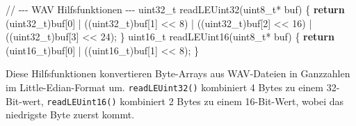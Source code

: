 \documentclass[
  ngerman,
  letterpaper,
  DIV=11]{scrreprt}
\newenvironment{Shaded}{\begin{snugshade}}{\end{snugshade}}
\newcommand{\CommentTok}[1]{\textcolor[rgb]{0.37,0.37,0.37}{#1}}
\newcommand{\ControlFlowTok}[1]{\textcolor[rgb]{0.00,0.23,0.31}{\textbf{#1}}}
\newcommand{\DataTypeTok}[1]{\textcolor[rgb]{0.68,0.00,0.00}{#1}}
\newcommand{\DecValTok}[1]{\textcolor[rgb]{0.68,0.00,0.00}{#1}}
\newcommand{\NormalTok}[1]{\textcolor[rgb]{0.00,0.23,0.31}{#1}}
\newcommand{\OperatorTok}[1]{\textcolor[rgb]{0.37,0.37,0.37}{#1}}
\begin{document}
\begin{Shaded}
\begin{Highlighting}[]
\CommentTok{// {-}{-}{-} WAV Hilfsfunktionen {-}{-}{-}}
\DataTypeTok{uint32\_t}\NormalTok{ readLEUint32}\OperatorTok{(}\DataTypeTok{uint8\_t}\OperatorTok{*}\NormalTok{ buf}\OperatorTok{)} \OperatorTok{\{}
  \ControlFlowTok{return} \OperatorTok{(}\DataTypeTok{uint32\_t}\OperatorTok{)}\NormalTok{buf}\OperatorTok{[}\DecValTok{0}\OperatorTok{]} \OperatorTok{|} \OperatorTok{((}\DataTypeTok{uint32\_t}\OperatorTok{)}\NormalTok{buf}\OperatorTok{[}\DecValTok{1}\OperatorTok{]} \OperatorTok{\textless{}\textless{}} \DecValTok{8}\OperatorTok{)} 
  \OperatorTok{|} \OperatorTok{((}\DataTypeTok{uint32\_t}\OperatorTok{)}\NormalTok{buf}\OperatorTok{[}\DecValTok{2}\OperatorTok{]} \OperatorTok{\textless{}\textless{}} \DecValTok{16}\OperatorTok{)} \OperatorTok{|} \OperatorTok{((}\DataTypeTok{uint32\_t}\OperatorTok{)}\NormalTok{buf}\OperatorTok{[}\DecValTok{3}\OperatorTok{]} \OperatorTok{\textless{}\textless{}} \DecValTok{24}\OperatorTok{);}
\OperatorTok{\}}
\DataTypeTok{uint16\_t}\NormalTok{ readLEUint16}\OperatorTok{(}\DataTypeTok{uint8\_t}\OperatorTok{*}\NormalTok{ buf}\OperatorTok{)} \OperatorTok{\{}
  \ControlFlowTok{return} \OperatorTok{(}\DataTypeTok{uint16\_t}\OperatorTok{)}\NormalTok{buf}\OperatorTok{[}\DecValTok{0}\OperatorTok{]} \OperatorTok{|} \OperatorTok{((}\DataTypeTok{uint16\_t}\OperatorTok{)}\NormalTok{buf}\OperatorTok{[}\DecValTok{1}\OperatorTok{]} \OperatorTok{\textless{}\textless{}} \DecValTok{8}\OperatorTok{);}
\OperatorTok{\}}
\end{Highlighting}
\end{Shaded}

Diese Hilfsfunktionen konvertieren Byte-Arrays aus WAV-Dateien in
Ganzzahlen im Little-Edian-Format um. \texttt{readLEUint32()} kombiniert
4 Bytes zu einem 32-Bit-wert, \texttt{readLEUint16()} kombiniert 2 Bytes
zu einem 16-Bit-Wert, wobei das niedrigste Byte zuerst kommt.
\end{document}
